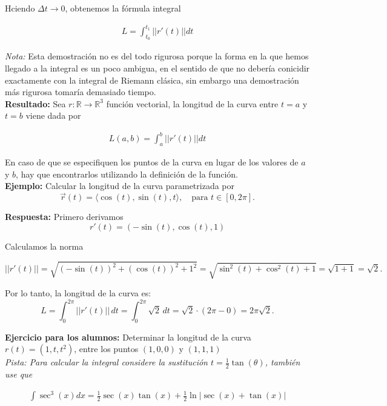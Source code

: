 \documentclass{article}
\theoremstyle{definition}
\begin{document}
Hciendo $\Delta t \to 0$, obtenemos la f\'ormula integral

\begin{align*}
    L = \int_{t_0}^{t_1} || r'(t)|| dt
\end{align*}

\textit{Nota:} Esta demostraci\'on no es del todo rigurosa porque la forma en la que hemos llegado a la integral es un poco ambigua, en el sentido de que no deber\'ia conicidir exactamente con la integral de Riemann cl\'asica, sin embargo una demostraci\'on m\'as rigurosa tomar\'ia demasiado tiempo. \\

\textbf{Resultado:} Sea $r: \mathbb{R} \to \mathbb{R}^3$ función vectorial, la longitud de la curva entre $t=a$ y $t=b$ viene dada por

\begin{align*}
    L(a,b) = \int_a^b ||r'(t)|| dt
\end{align*}

En caso de que se especifiquen los puntos de la curva en lugar de los valores de $a$ y $b$, hay que encontrarlos utilizando la definición de la función. \\


\textbf{Ejemplo: } Calcular la longitud de la curva parametrizada por
\[
\vec{r}(t) = \langle \cos(t), \sin(t), t \rangle, \quad \text{para } t \in [0, 2\pi].
\]

\textbf{Respuesta:} Primero derivamos 
\[
r'(t) = ( -\sin(t), \cos(t), 1 )
\]

Calculamos la norma

\[
|| r'(t) || = \sqrt{(-\sin(t))^2 + (\cos(t))^2 + 1^2} = \sqrt{\sin^2(t) + \cos^2(t) + 1} = \sqrt{1 + 1} = \sqrt{2}.
\]

Por lo tanto, la longitud de la curva es:
\[
L = \int_0^{2\pi} || r'(t) || \, dt = \int_0^{2\pi} \sqrt{2} \, dt = \sqrt{2} \cdot (2\pi - 0) = 2\pi\sqrt{2}.
\]

\textbf{Ejercicio para los alumnos: } Determinar la longitud de la curva $r(t) = (1,t,t^2)$, entre los puntos $(1,0,0)$ y $(1,1,1)$ \\

\textit{Pista: Para calcular la integral considere la sustituci\'on $t=\frac{1}{2}\tan(\theta)$, tambi\'en use que}

\begin{align*}
    \int \sec^3(x)dx = \frac{1}{2}\sec(x)\tan(x)+\frac{1}{2}\ln|\sec(x)+\tan(x)|
\end{align*}
\end{document}

